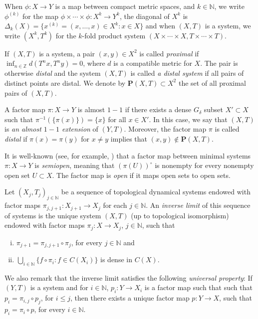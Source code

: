 \documentclass[reqno]{amsart}
\def\Z{{\mathbb Z}}
\def\N{{\mathbb N}}
\theoremstyle{definition}
\theoremstyle{remark}
\def\N{{\mathbb N}}
\begin{document}
When $\phi:X\to Y$ is a map between compact metric spaces, and $k\in \N$, we write $\phi^{(k)}$ for the map $\phi \times \cdots \times \phi: X^k \to Y^k$, the diagonal of $X^k$ is $\Delta_k(X)=\{x^{(k)}=(x,\ldots,x)\in X^k: x\in X\}$ and when $(X,T)$ is a system, we write $(X^k,T^k)$ for the $k$-fold product system $(X\times \cdots \times X, T\times \cdots \times T)$. 

If $(X,T)$ is a system, a pair $(x,y)\in X^2$ is called \textit{proximal} if $\inf_{n\in \Z}d(T^nx,T^ny)=0$, where $d$ is 
a compatible metric for $X$. The pair is otherwise \textit{distal} and the system $(X,T)$ is called \textit{a distal system} if all pairs of distinct points are distal. We denote by $\textbf{P}(X,T)\subset X^2$ the set of all proximal pairs of $(X,T)$. 

A factor map $\pi:X\to Y$ is almost $1-1$ if there exists a dense $G_{\delta}$ subset $X' \subset X$ such that $\pi^{-1}(\{\pi(x)\})=\{x\}$ for all $x\in X'$. In this case, we say that $(X,T)$ is \textit{an almost $1-1$ extension} of $(Y,T)$. Moreover, the factor map $\pi$ is called \textit{distal} if $\pi(x)=\pi(y)$ for $x\neq y$ implies that $(x,y) \notin \textbf{P}(X,T)$.

It is well-known (see, for example, \cite[Lemma 2.9]{Glasscock_Koutsogiannis_Richter}) 
that a factor map between minimal systems $\pi: X\to Y$ is \textit{semiopen}, meaning that $(\pi(U))^{\circ}$ is nonempty for every nonempty open set $U\subset X$. The factor map is \textit{open} if it maps open sets to open sets. 

Let $(X_j,T_j)_{j\in \N}$ be a sequence of topological dynamical systems endowed with factor maps $\pi_{j,j+1}: X_{j+1}\to X_j$ for each $j\in \N$. An \emph{inverse limit} of this sequence of systems is the unique system $(X,T)$ (up to topological isomorphism) endowed with factor maps $\pi_j:X\to X_j$, $j\in \N$, such that
\begin{enumerate}[(i)]
    \item \label{point inverse 1}  $\pi_{j+1}=\pi_{j,j+1} \circ \pi_j$, for every $j\in \N$ and 
      \item $\bigcup_{i\in \N} \{f \circ \pi_i : f\in C(X_i)\}$ is dense in $C(X)$.
\end{enumerate}
We also remark that the inverse limit satisfies the following \textit{universal property}: If $(Y, T)$ is a system and for $i\in \N$, $p_i:Y \to X_i$ is a factor map such that such that $p_i=\pi_{i,j} \circ p_j$, for $i\leq j$, then there exists a unique factor map $p:Y\to X$, such
that $p_i = \pi_i \circ p$, for every $i\in \N$.
\end{document}

